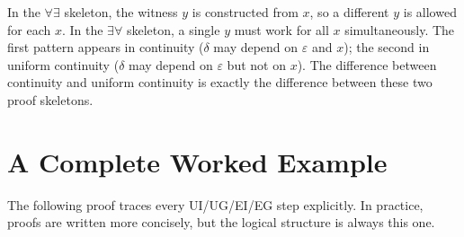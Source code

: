 \begin{remark*}
In the $\forall\exists$ skeleton, the witness $y$ is constructed from $x$, so
a different $y$ is allowed for each $x$. In the $\exists\forall$ skeleton, a
single $y$ must work for all $x$ simultaneously. The first pattern appears
in continuity ($\delta$ may depend on $\varepsilon$ and $x$); the second in
uniform continuity ($\delta$ may depend on $\varepsilon$ but not on $x$).
The difference between continuity and uniform continuity is exactly the
difference between these two proof skeletons.
\end{remark*}


\section*{A Complete Worked Example}

\begin{exposition}
The following proof traces every UI/UG/EI/EG step explicitly. In practice,
proofs are written more concisely, but the logical structure is always this one.
\end{exposition}

